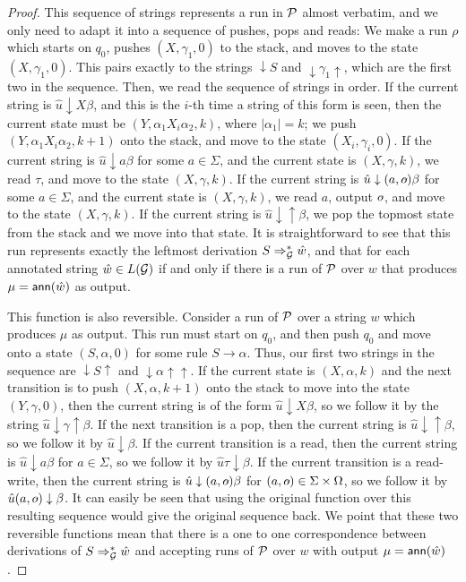 \begin{proof}
This sequence of strings represents a run in $\mathcal{P}$ almost verbatim, and we only need to adapt it into a sequence of pushes, pops and reads: We make a run $\rho$ which starts on $q_0$, pushes $(X, \gamma_1, 0)$ to the stack, and moves to the state $(X, \gamma_1, 0)$. This pairs exactly to the strings $\downarrow S$ and $
\downarrow \gamma_1\uparrow$, which are the first two in the sequence. Then, we read the sequence of strings in order. If the current string is $\hat{u}\downarrow X\beta$, and this is the $i$-th time a string of this form is seen, then the current state must be $(Y, \alpha_1 X_i \alpha_2, k)$, where $|\alpha_1| = k$; we push $(Y, \alpha_1 X_i \alpha_2, k+1)$ onto the stack, and move to the state $(X_i, \gamma_i, 0)$. If the current string is $\hat{u}\downarrow a \beta$ for some $a\in \Sigma$, and the current state is $(X, \gamma, k)$, we read $\tau$, and move to the state $(X, \gamma, k)$. If the current string is $\hat{u}\downarrow (a, \oout) \beta$ for some $a\in \Sigma$, and the current state is $(X, \gamma, k)$, we read $a$, output $\oout$, and move to the state $(X, \gamma, k)$. If the current string is $\hat{u}\downarrow\uparrow\beta$, we pop the topmost state from the stack 
  and we move into that state. It is straightforward to see that this run represents exactly the leftmost derivation $S\Rightarrow_{\mathcal{G}}^* \hat{w}$, and that for each annotated string $\hat{w}\in L(\mathcal{G})$ if and only if there is a run of $\mathcal{P}$ over $w$ that produces $\mu = \mathsf{ann}(\hat{w})$ as output.

This function is also reversible. Consider a run of $\mathcal{P}$ over a string $w$ which produces $\mu$ as output. This run must start on $q_0$, and then push $q_0$ and move onto a state $(S, \alpha, 0)$ for some rule $S \to \alpha$. Thus, our first two strings in the sequence are $\downarrow S\uparrow$ and $\downarrow \alpha\uparrow\uparrow$. If the current state is $(X, \alpha, k)$ and the next transition is to push $(X, \alpha, k+1)$ onto the stack to move into the state $(Y, \gamma, 0)$, then the current string is of the form $\hat{u}\downarrow X \beta$, so we follow it by the string $\hat{u}\downarrow \gamma\uparrow\beta$. If the next transition is a pop, then the current string is $\hat{u}\downarrow\uparrow\beta$, so we follow it by $\hat{u}\downarrow\beta$. If the current transition is a read, then the current string is $\hat{u}\downarrow a\beta$ for $a\in\Sigma$, so we follow it by $\hat{u}\tau\downarrow\beta$. If the current transition is a read-write, then the current string is $\hat{u}\downarrow (a, \oout)\beta$ for $(a, \oout)\in \Sigma\times\Omega$, so we follow it by $\hat{u}(a, \oout)\downarrow\beta$. It can easily be seen that using the original function over this resulting sequence would give the original sequence back. We point that these two reversible functions mean that there is a one to one correspondence between derivations of $S\Rightarrow_{\mathcal{G}}^* \hat{w}$ and accepting runs of $\mathcal{P}$ over $w$ with output $\mu = \mathsf{ann}(\hat{w})$.


\end{proof}
